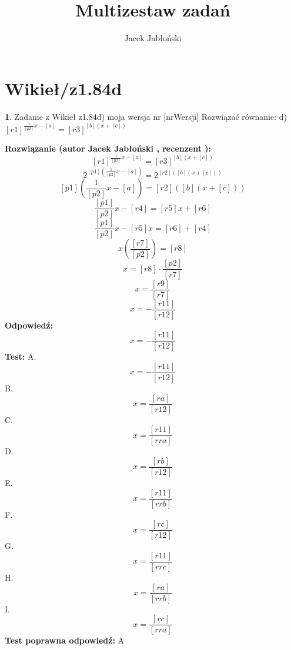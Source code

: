 \documentclass[12pt, a4paper]{article}
\title{Multizestaw zadań}
\author{Jacek Jabłoński}
\date{}
\theoremstyle{definition} %
\newtheorem{zad}{}
\newcommand{\kategoria}[1]{\section{#1}} %
\newcommand{\zadStart}[1]{\begin{zad}#1\newline} %
\newcommand{\zadStop}{\end{zad}}   %
\newcommand{\rozwStart}[2]{\noindent \textbf{Rozwiązanie (autor #1 , recenzent #2): }\newline} %
\newcommand{\rozwStop}{\newline}                                            %
\newcommand{\odpStart}{\noindent \textbf{Odpowiedź:}\newline}    %
\newcommand{\odpStop}{\newline}                                             %
\newcommand{\testStart}{\noindent \textbf{Test:}\newline} %
\newcommand{\testStop}{\newline} %
\newcommand{\kluczStart}{\noindent \textbf{Test poprawna odpowiedź:}\newline} %
\newcommand{\kluczStop}{\newline} %
\begin{document}
\maketitle


\kategoria{Wikieł/z1.84d}
\zadStart{Zadanie z Wikieł z1.84d) moja wersja nr [nrWersji]}
Rozwiązać równanie:
d) $[r1]^{\frac{1}{[p2]} x - [a]} = [r3]^{[b] (x + [c])}$
\zadStop
\rozwStart{Jacek Jabłoński}{}
$$[r1]^{\frac{1}{[p2]} x - [a]} = [r3]^{[b] (x + [c])}$$
$$2^{[p1](\frac{1}{[p2]} x - [a])} = 2^{[r2]([b] (x + [c]))}$$
$$[p1](\frac{1}{[p2]} x - [a]) = [r2]([b] (x + [c]))$$
$$\frac{[p1]}{[p2]}x - [r4] = [r5]x + [r6] $$
$$\frac{[p1]}{[p2]}x - [r5]x = [r6]+[r4]$$
$$x(\frac{[r7]}{[p2]}) = [r8]$$
$$x=[r8] \cdot \frac{[p2]}{[r7]}$$
$$x=\frac{[r9]}{[r7]}$$
$$x=- \frac{[r11]}{[r12]}$$
\rozwStop
\odpStart
$$x=- \frac{[r11]}{[r12]}$$
\odpStop
\testStart
A. $$x=- \frac{[r11]}{[r12]}$$
B. $$x = \frac{[ra]}{[r12]}$$
C. $$x = \frac{[r11]}{[rra]}$$
D. $$x = \frac{[rb]}{[r12]}$$
E. $$x = \frac{[r11]}{[rrb]}$$
F. $$x = \frac{[rc]}{[r12]}$$
G. $$x = \frac{[r11]}{[rrc]}$$
H. $$x = \frac{[ra]}{[rrb]}$$
I. $$x = \frac{[rc]}{[rra]}$$
\testStop
\kluczStart
A
\kluczStop
\end{document}
